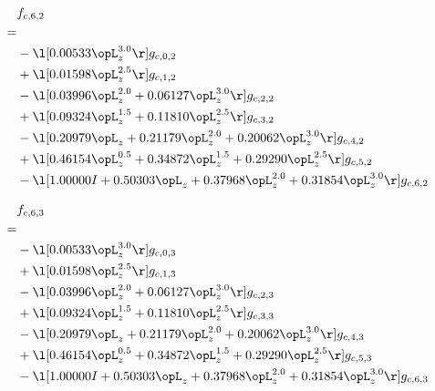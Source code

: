 \begin{alignat}{2} 
\label{eq:f_62_0} 
& f_{c,6,2} \nonumber \\ 
 = \\ 
& - \l[  0.00533 \opL_z^{3.0}  \r] g_{c,0,2} \nonumber \\ 
& + \l[  0.01598 \opL_z^{2.5}  \r] g_{c,1,2} \nonumber \\ 
& - \l[  0.03996 \opL_z^{2.0} +  0.06127 \opL_z^{3.0}  \r] g_{c,2,2} \nonumber \\ 
& + \l[  0.09324 \opL_z^{1.5} +  0.11810 \opL_z^{2.5}  \r] g_{c,3,2} \nonumber \\ 
& - \l[  0.20979 \opL_z +  0.21179 \opL_z^{2.0} +  0.20062 \opL_z^{3.0}  \r] g_{c,4,2} \nonumber \\ 
& + \l[  0.46154 \opL_z^{0.5} +  0.34872 \opL_z^{1.5} +  0.29290 \opL_z^{2.5}  \r] g_{c,5,2} \nonumber \\ 
& - \l[  1.00000 I +  0.50303 \opL_z +  0.37968 \opL_z^{2.0} +  0.31854 \opL_z^{3.0}  \r] g_{c,6,2} \nonumber \\ 
\end{alignat} 


\begin{alignat}{2} 
\label{eq:f_63_0} 
& f_{c,6,3} \nonumber \\ 
 = \\ 
& - \l[  0.00533 \opL_z^{3.0}  \r] g_{c,0,3} \nonumber \\ 
& + \l[  0.01598 \opL_z^{2.5}  \r] g_{c,1,3} \nonumber \\ 
& - \l[  0.03996 \opL_z^{2.0} +  0.06127 \opL_z^{3.0}  \r] g_{c,2,3} \nonumber \\ 
& + \l[  0.09324 \opL_z^{1.5} +  0.11810 \opL_z^{2.5}  \r] g_{c,3,3} \nonumber \\ 
& - \l[  0.20979 \opL_z +  0.21179 \opL_z^{2.0} +  0.20062 \opL_z^{3.0}  \r] g_{c,4,3} \nonumber \\ 
& + \l[  0.46154 \opL_z^{0.5} +  0.34872 \opL_z^{1.5} +  0.29290 \opL_z^{2.5}  \r] g_{c,5,3} \nonumber \\ 
& - \l[  1.00000 I +  0.50303 \opL_z +  0.37968 \opL_z^{2.0} +  0.31854 \opL_z^{3.0}  \r] g_{c,6,3} \nonumber \\ 
\end{alignat} 


